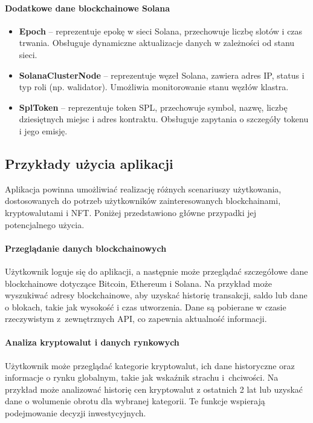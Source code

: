 \paragraph{Dodatkowe dane blockchainowe Solana}
\begin{itemize}
\item \textbf{Epoch} -- reprezentuje epokę w sieci Solana, przechowuje liczbę slotów i czas trwania. Obsługuje dynamiczne aktualizacje danych w zależności od stanu sieci.
\item \textbf{SolanaClusterNode} -- reprezentuje węzeł Solana, zawiera adres IP, status i typ roli (np. walidator). Umożliwia monitorowanie stanu węzłów klastra.
\item \textbf{SplToken} -- reprezentuje token SPL, przechowuje symbol, nazwę, liczbę dziesiętnych miejsc i adres kontraktu. Obsługuje zapytania o szczegóły tokenu i jego emisję.
\end{itemize}

\subsection{Przykłady użycia aplikacji}
Aplikacja powinna umożliwiać realizację różnych scenariuszy użytkowania, dostosowanych do potrzeb użytkowników zainteresowanych blockchainami, kryptowalutami i NFT. Poniżej przedstawiono główne przypadki jej potencjalnego użycia.

\paragraph{Przeglądanie danych blockchainowych}
Użytkownik loguje się do aplikacji, a następnie może przeglądać szczegółowe dane blockchainowe dotyczące Bitcoin, Ethereum i Solana. Na przykład może wyszukiwać adresy blockchainowe, aby uzyskać historię transakcji, saldo lub dane o blokach, takie jak wysokość i czas utworzenia. Dane są pobierane w czasie rzeczywistym z~zewnętrznych API, co zapewnia aktualność informacji.

\paragraph{Analiza kryptowalut i danych rynkowych}
Użytkownik może przeglądać kategorie kryptowalut, ich dane historyczne oraz informacje o rynku globalnym, takie jak wskaźnik strachu i~chciwości. Na przykład może analizować historię cen kryptowalut z ostatnich 2 lat lub uzyskać dane o wolumenie obrotu dla wybranej kategorii. Te funkcje wspierają podejmowanie decyzji inwestycyjnych.

